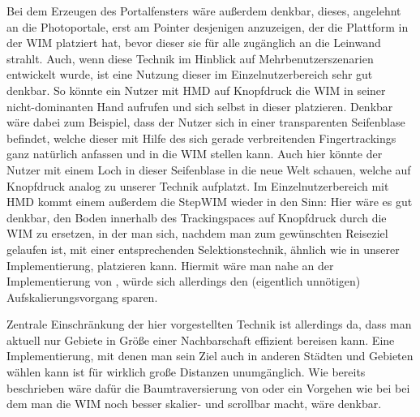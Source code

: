 Bei dem Erzeugen des Portalfensters wäre außerdem denkbar, dieses, angelehnt an die Photoportale, erst am Pointer desjenigen anzuzeigen, der die Plattform in der WIM platziert hat, bevor dieser sie für alle zugänglich an die Leinwand strahlt.
Auch, wenn diese Technik im Hinblick auf Mehrbenutzerszenarien entwickelt wurde, ist eine Nutzung dieser im Einzelnutzerbereich sehr gut denkbar. So könnte ein Nutzer mit HMD auf Knopfdruck die WIM in seiner nicht-dominanten Hand aufrufen und sich selbst in dieser platzieren. Denkbar wäre dabei zum Beispiel, dass der Nutzer sich in einer transparenten \glqq Seifenblase\grqq{} befindet, welche dieser mit Hilfe des sich gerade verbreitenden Fingertrackings ganz natürlich anfassen und in die WIM stellen kann. Auch hier könnte der Nutzer mit einem Loch in dieser \glqq Seifenblase\grqq{} in die neue Welt schauen, welche auf Knopfdruck analog zu unserer Technik \glqq aufplatzt\grqq{}. Im Einzelnutzerbereich mit HMD kommt einem außerdem die StepWIM\cite{Stoakley2010VirtualWIM} wieder in den Sinn:
Hier wäre es gut denkbar, den Boden innerhalb des Trackingspaces auf Knopfdruck durch die WIM zu ersetzen, in der man sich, nachdem man zum gewünschten Reiseziel gelaufen ist, mit einer entsprechenden Selektionstechnik, ähnlich wie in unserer Implementierung, platzieren kann.
Hiermit wäre man nahe an der Implementierung von \cite{Krekhov2018GulliVR}, würde sich allerdings den (eigentlich unnötigen) Aufskalierungsvorgang sparen.

Zentrale Einschränkung der hier vorgestellten Technik ist allerdings da, dass man aktuell nur Gebiete in Größe einer Nachbarschaft effizient bereisen kann. Eine Implementierung, mit denen man sein Ziel auch in anderen Städten und Gebieten wählen kann ist für wirklich große Distanzen unumgänglich. Wie bereits beschrieben wäre dafür die Baumtraversierung von \cite{pierce_representations} oder ein Vorgehen wie bei \cite{wingrave2006overcoming} bei dem man die WIM noch besser skalier- und scrollbar macht, wäre denkbar.
